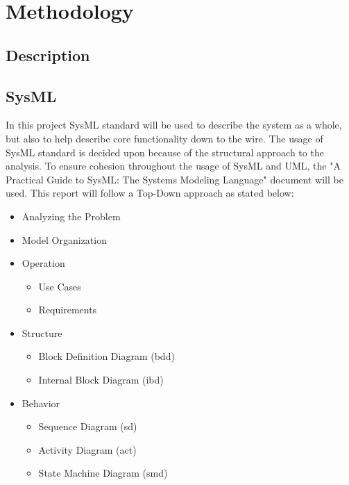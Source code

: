 \section{Methodology}
\subsection{Description}
\noindent{}


\subsection{SysML}
In this project SysML standard will be used to describe the system as a whole, but also to help describe core functionality down to the wire. The usage of SysML standard is decided upon because of the structural approach to the analysis. To ensure cohesion throughout the usage of SysML and UML, the "A Practical Guide to SysML: The Systems Modeling Language"\cite{Friedenthal2014} document will be used. This report will follow a Top-Down approach as stated below:

\begin{itemize}
	\item Analyzing the Problem
	\item Model Organization
	\item Operation
	\begin{itemize}
		\item Use Cases
		\item Requirements
	\end{itemize}
	\item Structure
	\begin{itemize}
		\item Block Definition Diagram (bdd)
		\item Internal Block Diagram (ibd)
	\end{itemize}
	\item Behavior
	\begin{itemize}
		\item Sequence Diagram (sd)
		\item Activity Diagram (act)
		\item State Machine Diagram (smd)
	\end{itemize}
\end{itemize}


